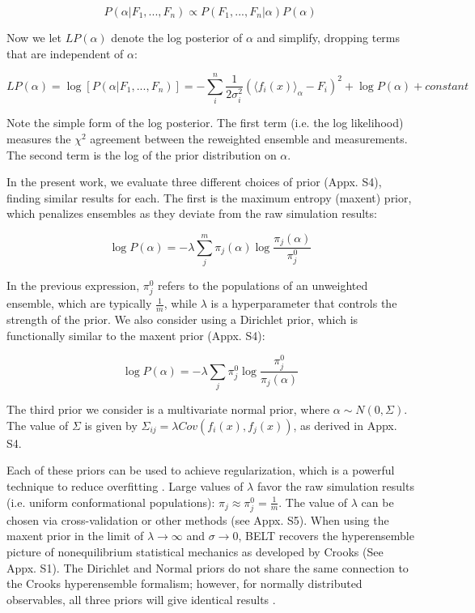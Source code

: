 \documentclass[journal=jacsat,manuscript=article]{achemso}
\begin{document}
$$P(\alpha | F_1, ..., F_n) \propto P(F_1, ..., F_n | \alpha) P(\alpha)$$

Now we let $LP(\alpha)$ denote the log posterior of $\alpha$ and simplify, dropping terms that are independent of $\alpha$:

$$LP(\alpha) = \log[ P(\alpha|F_1, ..., F_n)] = -\sum_i^n \frac{1}{2\sigma_i^2}(\langle f_i(x)\rangle _\alpha - F_i)^2 + \log P(\alpha) + constant$$

Note the simple form of the log posterior.  The first term (i.e. the log likelihood) measures the $\chi^2$ agreement between the reweighted ensemble and measurements.  The second term is the log of the prior distribution on $\alpha$.  

In the present work, we evaluate three different choices of prior (Appx. S4), finding similar results for each.  The first is the maximum entropy (maxent) prior, which penalizes ensembles as they deviate from the raw simulation results:

$$\log P(\alpha) = -\lambda \sum_j^m \pi_j(\alpha) \log \frac{\pi_j(\alpha)}{\pi_j^0}$$

In the previous expression, $\pi_j^0$ refers to the populations of an unweighted ensemble, which are typically $\frac{1}{m}$, while $\lambda$ is a hyperparameter that controls the strength of the prior.  We also consider using a Dirichlet prior, which is functionally similar to the maxent prior (Appx. S4):

$$\log P(\alpha) = -\lambda \sum_j \pi_j^0 \log \frac{\pi_j^0}{\pi_j(\alpha)}$$

The third prior we consider is a multivariate normal prior, where  $\alpha \sim N(0, \Sigma)$.  The value of $\Sigma$ is given by $\Sigma_{ij} = \lambda Cov(f_i(x), f_j(x))$, as derived in Appx. S4.

Each of these priors can be used to achieve regularization, which is a powerful technique to reduce overfitting \cite{friedman2001elements}.  Large values of $\lambda$ favor the raw simulation results (i.e. uniform conformational populations): $\pi_j \approx \pi_j^0 = \frac{1}{m}$.  The value of $\lambda$ can be chosen via cross-validation or other methods (see Appx. S5).  When using the maxent prior in the limit of $\lambda \rightarrow \infty$ and $\sigma \rightarrow 0$, BELT recovers the hyperensemble picture of nonequilibrium statistical mechanics as developed \cite{crooks2007beyond} by Crooks (See Appx. S1).  The Dirichlet and Normal priors do not share the same connection to the Crooks hyperensemble formalism; however, for normally distributed observables, all three priors will give identical results \cite{relative_entropy_wiki}.  
\end{document}
